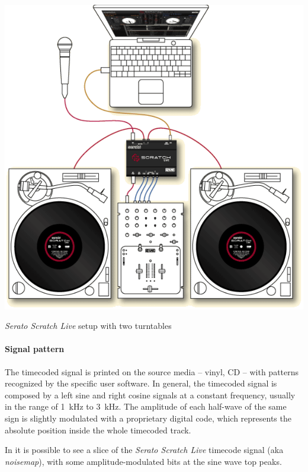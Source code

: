 \documentclass[a4paper,10pt]{article}
\makeatletter
\newenvironment{figurehere}{\def\@captype{figure}\vspace{2ex}}{\vspace{2ex}}
\makeatother
\begin{document}
\begin{multicols}{2}
\begin{figurehere}
	\centering
	\includegraphics[keepaspectratio=true,width=0.9\columnwidth]{images/serato_setup.pdf}
	\caption{\emph{Serato Scratch Live} setup with two turntables}
	\label{fig:serato_setup}
\end{figurehere}


\paragraph{Signal pattern}
The timecoded signal is printed on the source media -- vinyl, CD -- with
patterns recognized by the specific user software. In general, the timecoded
signal is composed by a left sine and right cosine signals at a constant
frequency, usually in the range of 1~kHz to 3~kHz. The amplitude of each
half-wave of the same sign is slightly modulated with a proprietary digital
code, which represents the absolute position inside the whole timecoded track.

In  it is possible to see a slice of the
\emph{Serato Scratch Live} \cite{rane_ssl} timecode signal (aka
\emph{noisemap}), with some amplitude-modulated bits at the sine wave top
peaks.


\end{multicols}
\end{document}

